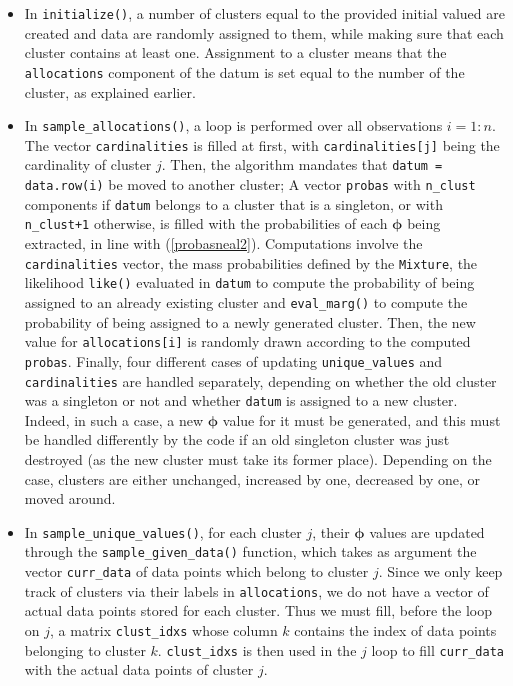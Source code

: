 \begin{itemize}
	\item In \verb|initialize()|, a number of clusters equal to the provided initial valued are created and data are randomly assigned to them, while making sure that each cluster contains at least one.
	Assignment to a cluster means that the \verb|allocations| component of the datum is set equal to the number of the cluster, as explained earlier.

	\item In \verb|sample_allocations()|, a loop is performed over all observations $i=1:n$.
	The vector \verb|cardinalities| is filled at first, with \verb|cardinalities[j]| being the cardinality of cluster $j$.
	Then, the algorithm mandates that \verb|datum = data.row(i)| be moved to another cluster;
	A vector \verb|probas| with \verb|n_clust| components if \verb|datum| belongs to a cluster that is a singleton, or with \verb|n_clust+1| otherwise, is filled with the probabilities of each $\boldsymbol\phi$ being extracted, in line with (\ref{probasneal2}).
	Computations involve the \verb|cardinalities| vector, the mass probabilities defined by the \verb|Mixture|, the likelihood \verb|like()| evaluated in \verb|datum| to compute the probability of being assigned to an already existing cluster and \verb|eval_marg()| to compute the probability of being assigned to a newly generated cluster. Then, the new value for \verb|allocations[i]| is randomly drawn according to the computed \verb|probas|.
	Finally, four different cases of updating \verb|unique_values| and \verb|cardinalities| are handled separately, depending on whether the old cluster was a singleton or not and whether \verb|datum| is assigned to a new cluster.
	Indeed, in such a case, a new $\boldsymbol\phi$ value for it must be generated, and this must be handled differently by the code if an old singleton cluster was just destroyed (as the new cluster must take its former place).
	Depending on the case, clusters are either unchanged, increased by one, decreased by one, or moved around.

	\item In \verb|sample_unique_values()|, for each cluster $j$, their $\boldsymbol\phi$ values are updated through the \verb|sample_given_data()| function, which takes as argument the vector \verb|curr_data| of data points which belong to cluster $j$.
	Since we only keep track of clusters via their labels in \verb|allocations|, we do not have a vector of actual data points stored for each cluster.
	Thus we must fill, before the loop on $j$, a matrix \verb|clust_idxs| whose column $k$ contains the index of data points belonging to cluster $k$.
	\verb|clust_idxs| is then used in the $j$ loop to fill \verb|curr_data| with the actual data points of cluster $j$.

\end{itemize}


